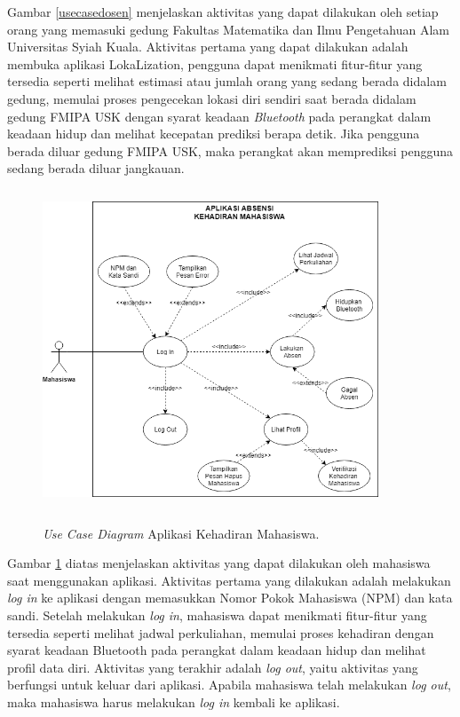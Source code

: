 \par Gambar \ref{usecasedosen} menjelaskan aktivitas yang dapat dilakukan oleh setiap orang yang memasuki gedung Fakultas Matematika dan Ilmu Pengetahuan Alam Universitas Syiah Kuala. Aktivitas pertama yang dapat dilakukan adalah membuka aplikasi LokaLization, pengguna dapat menikmati fitur-fitur yang tersedia seperti melihat estimasi atau jumlah orang yang sedang berada didalam gedung, memulai proses pengecekan lokasi diri sendiri saat berada didalam gedung FMIPA USK dengan syarat keadaan \textit{Bluetooth} pada perangkat dalam keadaan hidup dan melihat kecepatan prediksi berapa detik. Jika pengguna berada diluar gedung FMIPA USK, maka perangkat akan memprediksi pengguna sedang berada diluar jangkauan.

\begin{figure}[H]
	\center
	\shadowbox
	{\includegraphics [width=10cm, height=9.5cm]{gambar/model/use-case-mahasiswa}}
	\caption{\textit{Use Case Diagram} Aplikasi Kehadiran Mahasiswa.}
	\label{usecasemahasiswa}
\end{figure}

\par Gambar \ref{usecasemahasiswa} diatas menjelaskan aktivitas yang dapat dilakukan oleh mahasiswa saat menggunakan aplikasi. Aktivitas pertama yang dilakukan adalah melakukan \textit{log in} ke aplikasi dengan memasukkan Nomor Pokok Mahasiswa (NPM) dan kata sandi. Setelah melakukan \textit{log in}, mahasiswa dapat menikmati fitur-fitur yang tersedia seperti melihat jadwal perkuliahan, memulai proses kehadiran dengan syarat keadaan Bluetooth pada perangkat dalam keadaan hidup dan melihat profil data diri. Aktivitas yang terakhir adalah \textit{log out}, yaitu aktivitas yang berfungsi untuk keluar dari aplikasi. Apabila mahasiswa telah melakukan \textit{log out}, maka mahasiswa harus melakukan \textit{log in} kembali ke aplikasi.

